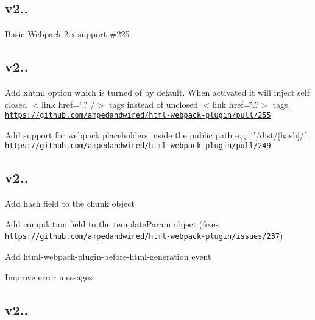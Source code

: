\subsection*{v2.. }


\begin{DoxyItemize}
\item Basic Webpack 2.\+x support \#225
\end{DoxyItemize}

\subsection*{v2.. }


\begin{DoxyItemize}
\item Add {\ttfamily xhtml} option which is turned of by default. When activated it will inject self closed {\ttfamily $<$link href=\char`\"{}..\char`\"{} /$>$} tags instead of unclosed {\ttfamily $<$link href=\char`\"{}..\char`\"{}$>$} tags. \href{https://github.com/ampedandwired/html-webpack-plugin/pull/255}{\tt https\+://github.\+com/ampedandwired/html-\/webpack-\/plugin/pull/255}
\item Add support for webpack placeholders inside the public path e.\+g. `'/dist/\mbox{[}hash\mbox{]}/\textquotesingle{}\`{}. \href{https://github.com/ampedandwired/html-webpack-plugin/pull/249}{\tt https\+://github.\+com/ampedandwired/html-\/webpack-\/plugin/pull/249}
\end{DoxyItemize}

\subsection*{v2.. }


\begin{DoxyItemize}
\item Add {\ttfamily hash} field to the chunk object
\item Add {\ttfamily compilation} field to the template\+Param object (fixes \href{https://github.com/ampedandwired/html-webpack-plugin/issues/237}{\tt https\+://github.\+com/ampedandwired/html-\/webpack-\/plugin/issues/237})
\item Add {\ttfamily html-\/webpack-\/plugin-\/before-\/html-\/generation} event
\item Improve error messages
\end{DoxyItemize}

\subsection*{v2.. }


